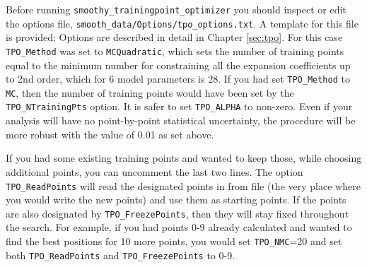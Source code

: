 \documentclass[UserManual.tex]{subfiles}
\begin{document}
\begin{sloppypar}
Before running {\tt smoothy\_trainingpoint\_optimizer} you should inspect or edit the options file, {\tt smooth\_data/Options/tpo\_options.txt}. A template for this file is provided:
\vspace*{-8pt}{\tt \begin{Verbatim}[commandchars=\\\{\}]
TPO_Method  MCQuadratic  # can be "MC", "MCSphere", "MCSimplex", "MCSimplexPlus1", "MCQuadratic", "MCSphereQuadratic"
TPO_NTrainingPts    0   # only relevant for OptimizeMethod="MCSphere" or "MC"
TPO_NMC  100000
TPO_ALPHA 0.01 # does not have to be the same value used to train emulator
TPO_Include_LAMBDA_Uncertainty true # dangerous to set this to false
TPO_FullModelRunsDirName  smooth_data/FullModelRuns
#TPO_ReadPoints 0,1,4-7,10,11-13,21
#TPO_FreezePoints 0,1,4-7,10,11-13,21
\end{Verbatim}
}\vspace*{-8pt}
Options are described in detail in Chapter \ref{sec:tpo}. For this case {\tt TPO\_Method} was set to {\tt MCQuadratic}, which sets the number of training points equal to the minimum number for constraining all the expansion coefficients up to 2nd order, which for 6 model parameters is 28. If you had set {\tt TPO\_Method} to {\tt MC}, then the number of training points would have been set by the {\tt TPO\_NTrainingPts} option. It is safer to set {\tt TPO\_ALPHA} to non-zero. Even if your analysis will have no point-by-point statistical uncertainty, the procedure will be more robust with the value of 0.01 as set above.

If you had some existing training points and wanted to keep those, while choosing additional points, you can uncomment the last two lines. The option {\tt TPO\_ReadPoints} will read the designated points in from file (the very place where you would write the new points) and use them as starting points. If the points are also designated by {\tt TPO\_FreezePoints}, then they will stay fixed throughout the search. For example, if you had points 0-9 already calculated and wanted to find the best positions for 10 more points, you would set {\tt TPO\_NMC}=20 and set both {\tt TPO\_ReadPoints} and {\tt TPO\_FreezePoints} to 0-9.


\end{sloppypar}
\end{document}
